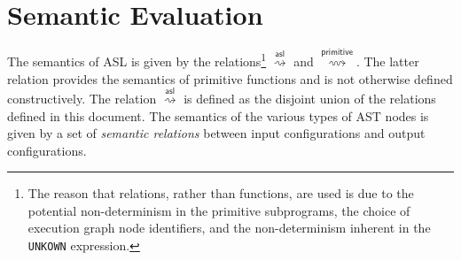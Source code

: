 \documentclass{book}
\newcommand\evalarrow[0]{\stackrel{\mathsf{asl}}{\rightsquigarrow}}
\newcommand\evalprimitivearrow[0]{\stackrel{\mathsf{primitive}}{\rightsquigarrow}}
\begin{document}
\section{Semantic Evaluation}

The semantics of ASL is given by the relations\footnote{The reason that relations, rather than functions, are used is due to the
potential non-determinism in the primitive subprograms,
the choice of execution graph node identifiers,
and the non-determinism inherent in the \texttt{UNKOWN} expression.}
$\evalarrow$ and $\evalprimitivearrow$.
The latter relation provides the semantics of primitive functions and is not otherwise defined
constructively.
The relation $\evalarrow$ is defined as the disjoint union of the relations defined in this document.
The semantics of the various types of AST nodes is given by a set of \emph{semantic relations} between
input configurations and output configurations.

\end{document}
